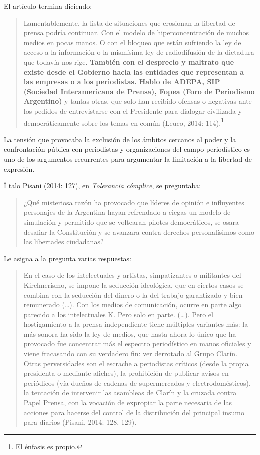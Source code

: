 El artículo termina diciendo:

\begin{quote}
Lamentablemente, la lista de situaciones que erosionan la libertad de prensa podría continuar. Con el modelo de hiperconcentración de muchos medios en pocas manos. O con el bloqueo que están sufriendo la ley de acceso a la información o la mismísima ley de radiodifusión de la dictadura que todavía nos rige. \textbf{También con el desprecio y maltrato que existe desde el Gobierno hacia las entidades que representan a las empresas o a los periodistas. Hablo de ADEPA, SIP (Sociedad Interamericana de Prensa), Fopea (Foro de Periodismo Argentino)} y tantas otras, que solo han recibido ofensas o negativas ante los pedidos de entrevistarse con el Presidente para dialogar civilizada y democráticamente sobre los temas en común (Leuco, 2014: 114).\footnote{El énfasis es propio.}
\end{quote}

La tensión que provocaba la exclusión de los ámbitos cercanos al poder y la confrontación pública con periodistas y organizaciones del campo periodístico es uno de los argumentos recurrentes para argumentar la limitación a la libertad de expresión.

Í talo Pisani (2014: 127), en \emph{Tolerancia cómplice}, se preguntaba:

\begin{quote}
¿Qué misteriosa razón ha provocado que líderes de opinión e influyentes personajes de la Argentina hayan refrendado a ciegas un modelo de simulación y permitido que se voltearan pilotes democráticos, se osara desafiar la Constitución y se avanzara contra derechos personalísimos como las libertades ciudadanas?
\end{quote}

Le asigna a la pregunta varias respuestas:

\begin{quote}
En el caso de los intelectuales y artistas, simpatizantes o militantes del Kirchnerismo, se impone la seducción ideológica, que en ciertos casos se combina con la seducción del dinero o la del trabajo garantizado y bien remunerado (\ldots). Con los medios de comunicación, ocurre en parte algo parecido a los intelectuales K. Pero solo en parte. (\ldots). Pero el hostigamiento a la prensa independiente tiene múltiples variantes más: la más sonora ha sido la ley de medios, que hasta ahora lo único que ha provocado fue concentrar más el espectro periodístico en manos oficiales y viene fracasando con su verdadero fin: ver derrotado al Grupo Clarín. Otras perversidades son el escrache a periodistas críticos (desde la propia presidenta o mediante afiches), la prohibición de publicar avisos en periódicos (vía dueños de cadenas de supermercados y electrodomésticos), la tentación de intervenir las asambleas de Clarín y la cruzada contra Papel Prensa, con la vocación de expropiar la parte necesaria de las acciones para hacerse del control de la distribución del principal insumo para diarios (Pisani, 2014: 128, 129).
\end{quote}

